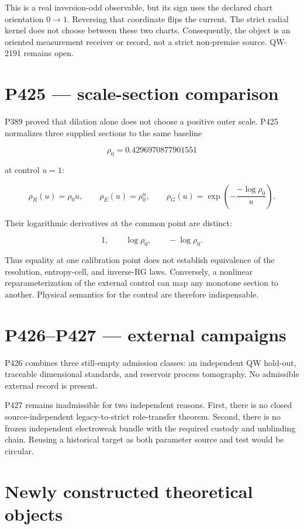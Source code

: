 \documentclass[11pt,a4paper,openany]{report}
\begin{document}
This is a real inversion-odd observable, but its sign uses the declared chart orientation \(0\to1\). Reversing that coordinate flips the current. The strict radial kernel does not choose between these two charts. Consequently, the object is an oriented measurement receiver or record, not a strict non-premise source. QW-2191 remains open.

\chapter{P425 --- scale-section comparison}

P389 proved that dilation alone does not choose a positive outer scale. P425 normalizes three supplied sections to the same baseline

\[
\rho_0=0.4296970877901551
\]

at control \(u=1\):

\[
\rho_R(u)=\rho_0u,
\qquad
\rho_E(u)=\rho_0^u,
\qquad
\rho_G(u)=\exp\!\left(-\frac{-\log\rho_0}{u}\right).
\]

Their logarithmic derivatives at the common point are distinct:

\[
1,
\qquad
\log\rho_0,
\qquad
-\log\rho_0.
\]

Thus equality at one calibration point does not establish equivalence of the resolution, entropy-cell, and inverse-RG laws. Conversely, a nonlinear reparameterization of the external control can map any monotone section to another. Physical semantics for the control are therefore indispensable.

\chapter{P426--P427 --- external campaigns}

P426 combines three still-empty admission classes: an independent QW hold-out, traceable dimensional standards, and reservoir process tomography. No admissible external record is present.

P427 remains inadmissible for two independent reasons. First, there is no closed source-independent legacy-to-strict role-transfer theorem. Second, there is no frozen independent electroweak bundle with the required custody and unblinding chain. Reusing a historical target as both parameter source and test would be circular.

\chapter{Newly constructed theoretical objects}
\end{document}
